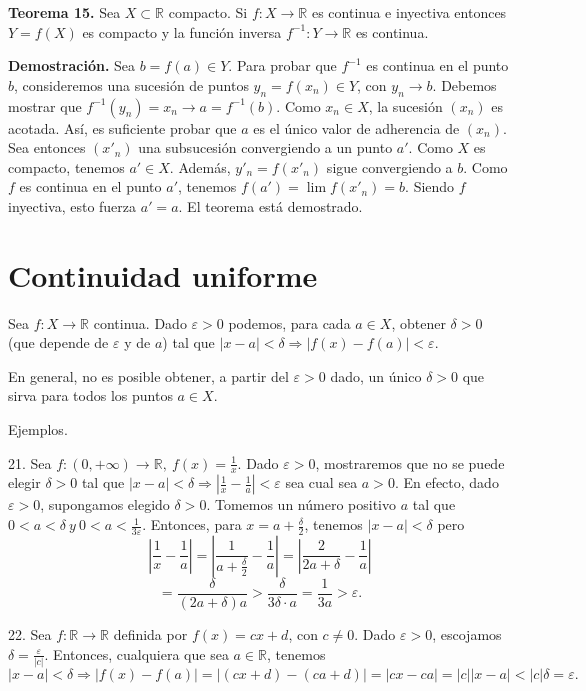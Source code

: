 \documentclass[12pt,oneside]{book}
\begin{document}
\textbf{Teorema 15.} Sea \(X \subset \mathbb{R}\) compacto. Si \(f: X \to \mathbb{R}\) es continua e inyectiva entonces \(Y = f(X)\) es compacto y la función inversa \(f^{-1}: Y \to \mathbb{R}\) es continua.

\textbf{Demostración.} Sea \(b = f(a) \in Y\). Para probar que \(f^{-1}\) es continua en el punto \(b\), consideremos una sucesión de puntos \(y_n = f(x_n) \in Y\), con \(y_n \to b\). Debemos mostrar que \(f^{-1}(y_n) = x_n \to a = f^{-1}(b)\). Como \(x_n \in X\), la sucesión \((x_n)\) es acotada. Así, es suficiente probar que \(a\) es el único valor de adherencia de \((x_n)\). Sea entonces \((x'_n)\) una subsucesión convergiendo a un punto \(a'\). Como \(X\) es compacto, tenemos \(a' \in X\). Además, \(y'_n = f(x'_n)\) sigue convergiendo a \(b\). Como \(f\) es continua en el punto \(a'\), tenemos \(f(a') = \lim f(x'_n) = b\). Siendo \(f\) inyectiva, esto fuerza \(a' = a\). El teorema está demostrado.

\section{Continuidad uniforme}

Sea \(f: X \to \mathbb{R}\) continua. Dado \(\varepsilon > 0\) podemos, para cada \(a \in X\), obtener \(\delta > 0\) (que depende de \(\varepsilon\) y de \(a\)) tal que \(|x - a| < \delta \Rightarrow |f(x) - f(a)| < \varepsilon\).

En general, no es posible obtener, a partir del \(\varepsilon > 0\) dado, un único \(\delta > 0\) que sirva para todos los puntos \(a \in X\).


Ejemplos.

21. Sea \( f: (0, +\infty) \to \mathbb{R}, \ f(x) = \frac{1}{x} \). Dado \( \varepsilon > 0 \), mostraremos que no se puede elegir \( \delta > 0 \) tal que \( |x - a| < \delta \Rightarrow \left| \frac{1}{x} - \frac{1}{a} \right| < \varepsilon \) sea cual sea \( a > 0 \). En efecto, dado \( \varepsilon > 0 \), supongamos elegido \( \delta > 0 \). Tomemos un número positivo \( a \) tal que \( 0 < a < \delta \ y \ 0 < a < \frac{1}{3\varepsilon} \). Entonces, para \( x = a + \frac{\delta}{2} \), tenemos \( |x - a| < \delta \) pero
\[
\left| \frac{1}{x} - \frac{1}{a} \right| = \left| \frac{1}{a + \frac{\delta}{2}} - \frac{1}{a} \right| = \left| \frac{2}{2a + \delta} - \frac{1}{a} \right|
\]
\[
= \frac{\delta}{(2a + \delta)a} > \frac{\delta}{3\delta \cdot a} = \frac{1}{3a} > \varepsilon.
\]

22. Sea \( f: \mathbb{R} \to \mathbb{R} \) definida por \( f(x) = cx + d \), con \( c \neq 0 \). Dado \( \varepsilon > 0 \), escojamos \( \delta = \frac{\varepsilon}{|c|} \). Entonces, cualquiera que sea \( a \in \mathbb{R} \), tenemos
\[
|x - a| < \delta \Rightarrow |f(x) - f(a)| = |(cx + d) - (ca + d)| = |cx - ca| = |c||x - a| < |c|\delta = \varepsilon.
\]
\end{document}

